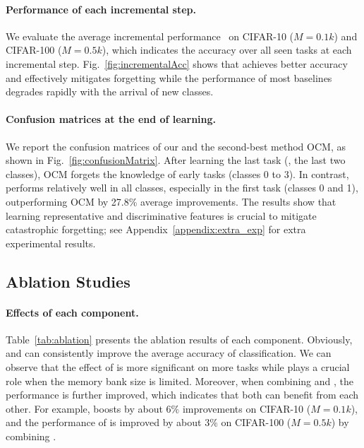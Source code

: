 \paragraph{Performance of each incremental step.}
We evaluate the average incremental performance~\cite{DER++, DVC} on CIFAR-10 ($M=0.1k$) and CIFAR-100 ($M=0.5k$), which indicates the accuracy over all seen tasks at each incremental step. 
Fig.~\ref{fig:incrementalAcc} shows that \frameworkName achieves better accuracy and effectively mitigates forgetting while the performance of most baselines degrades rapidly with the arrival of new classes.

\paragraph{Confusion matrices at the end of learning.}
We report the confusion matrices of our \frameworkName and the second-best method OCM, as shown in Fig.~\ref{fig:confusionMatrix}. 
After learning the last task (\ie, the last two classes), OCM forgets the knowledge of early tasks (classes 0 to 3). 
In contrast, \frameworkName performs relatively well in all classes, especially in the first task (classes 0 and 1), outperforming OCM by 27.8\% average improvements.
The results show that learning representative and discriminative features is crucial to mitigate catastrophic forgetting; see Appendix~\ref{appendix:extra_exp} for extra experimental results.  




\subsection{Ablation Studies}
\label{ablation}



\paragraph{Effects of each component.} Table~\ref{tab:ablation} presents the ablation results of each component. Obviously, \methodname and \dataaugname can consistently improve the average accuracy of classification. 
We can observe that the effect of \methodname is more significant on more tasks while \dataaugname plays a crucial role when the memory bank size is limited. Moreover, when combining \methodname and \dataaugname, the performance is further improved, which indicates that both can benefit from each other. For example, \dataaugname boosts \methodname by about 6$\%$ improvements on CIFAR-10 ($M=0.1k$), and the performance of \dataaugname is improved by about 3$\%$ on CIFAR-100 ($M=0.5k$) by combining \methodname.


